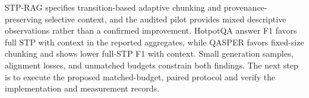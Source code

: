 \documentclass[10pt]{article}
\begin{document}
STP-RAG specifies transition-based adaptive chunking and provenance-preserving selective context, and the audited pilot provides mixed descriptive observations rather than a confirmed improvement. HotpotQA answer F1 favors full STP with context in the reported aggregates, while QASPER favors fixed-size chunking and shows lower full-STP F1 with context. Small generation samples, alignment losses, and unmatched budgets constrain both findings. The next step is to execute the proposed matched-budget, paired protocol and verify the implementation and measurement records.



\end{document}
